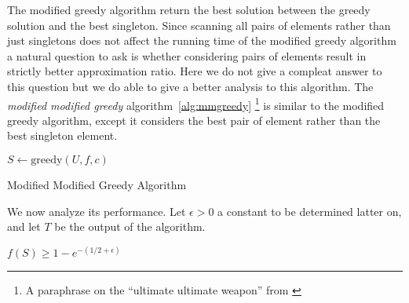 The modified greedy algorithm return the best solution between the greedy solution and the best singleton.
Since scanning all pairs of elements rather than just singletons does not affect the running time of the modified greedy algorithm a natural question to ask is whether considering pairs of elements result in strictly better approximation ratio.
Here we do not give a compleat answer to this question but we do able to give a better analysis to this algorithm. 
The \emph{modified modified greedy} algorithm~\ref{alg:mmgreedy} 
\footnote{A paraphrase on the ``ultimate ultimate weapon'' from \cite{ninjago2017}}
is similar to the  modified greedy algorithm, 
except it considers the best pair of element rather than the best singleton element.


\begin{algorithm}[H]
\label{alg:mmgreedy}



$S \leftarrow \text{greedy}(U, f, c)$
\\
\caption{Modified Modified Greedy Algorithm}
\end{algorithm}

We now analyze its performance.
Let $\epsilon > 0$ a constant to be determined latter on, and let $T$ be the output of 
the algorithm.

\begin{theorem}
$f(S) \geq 1 - e^{-(1/2 + \epsilon)}$
\end{theorem}

